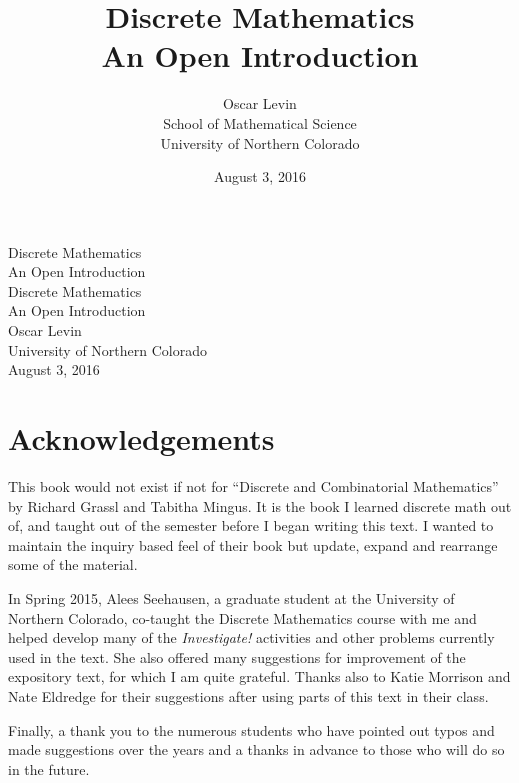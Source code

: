 \documentclass[10pt,]{book}
\title{Discrete Mathematics\\
{\large An Open Introduction}}
\author{Oscar Levin\\
School of Mathematical Science\\
University of Northern Colorado
}
\date{August 3, 2016}
\theoremstyle{plain}
\theoremstyle{definition}
\theoremstyle{definition}
\theoremstyle{definition}
\numberwithin{equation}{section}
\begin{document}
\frontmatter
\thispagestyle{empty}
{\centering
\vspace*{0.28\textheight}
{\Huge Discrete Mathematics}\\[2\baselineskip]
{\LARGE An Open Introduction}\\
}
\clearpage
\thispagestyle{empty}
\null%
\clearpage
\thispagestyle{empty}
{\centering
\vspace*{0.14\textheight}
{\Huge Discrete Mathematics}\\[\baselineskip]
{\LARGE An Open Introduction}\\[3\baselineskip]
{\Large Oscar Levin}\\[0.5\baselineskip]
{\Large University of Northern Colorado}\\[3\baselineskip]
{\Large August 3, 2016}\\}
\clearpage
\thispagestyle{empty}
\null\clearpage
\chapter*{Acknowledgements}\label{acknowledgement-1}

  This book would not exist if not for ``Discrete and Combinatorial Mathematics'' by Richard Grassl and Tabitha Mingus. It is the book I learned discrete math out of, and taught out of the semester before I began writing this text. I wanted to maintain the inquiry based feel of their book but update, expand and rearrange some of the material.
\par

  In Spring 2015, Alees Seehausen, a graduate student at the University of Northern Colorado, co-taught the Discrete Mathematics course with me and helped develop many of the \emph{Investigate!} activities and other problems currently used in the text. She also offered many suggestions for improvement of the expository text, for which I am quite grateful. Thanks also to Katie Morrison and Nate Eldredge for their suggestions after using parts of this text in their class.
\par

  Finally, a thank you to the numerous students who have pointed out typos and made suggestions over the years and a thanks in advance to those who will do so in the future.
\end{document}
